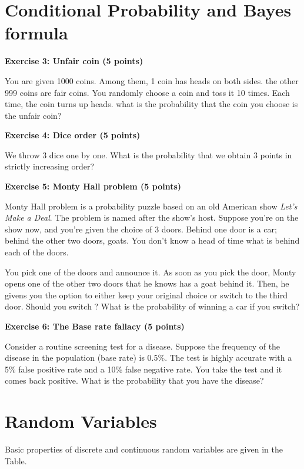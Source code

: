 \documentclass[11pt]{article}
\begin{document}
\section{Conditional Probability and Bayes formula}

{\bf Exercise 3: Unfair coin (5 points)}

You are given 1000 coins. Among them, 1 coin has heads on both sides. the other 999 coins are fair coins. You randomly choose a coin and toss it 10 times. Each time, the coin turns up heads. what is the probability that the coin you choose is the unfair coin? 

{\bf Exercise 4: Dice order (5 points)}


We throw 3 dice one by one. What is the probability that we obtain 3 points in strictly increasing order?


{\bf Exercise 5: Monty Hall problem (5 points)}

Monty Hall problem is a probability puzzle based on an old American show \emph{Let's Make a Deal}. The problem is named after the show's host. Suppose you're on the show now, and you're given the choice of 3 doors. Behind one door is a car; behind the other two doors, goats. You don't know a head of time what is behind each of the doors. 

You pick one of the doors and announce it. As soon as you pick the door, Monty opens one of the other two doors that he knows has a goat behind it. Then, he givens you the option to either keep your original choice or switch to the third door. Should you switch ? What is the probability of winning a car if you switch? 

{\bf Exercise 6: The Base rate fallacy (5 points)}

Consider a routine screening test for a disease. Suppose the frequency of the disease in the population (base rate) is 0.5\%. The test is highly accurate with a 5\% false positive rate and a 10\% false negative rate.
You take the test and it comes back positive. What is the probability that you have the disease?




 




\section{Random Variables}
Basic properties of discrete and continuous random variables are given in the Table. 
\end{document}
